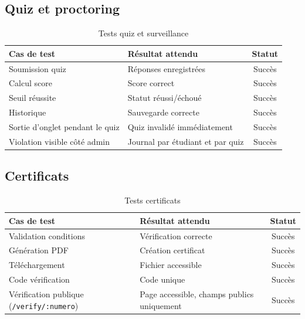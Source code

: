 \documentclass[12pt, a4paper]{report}
\begin{document}
\subsection{Quiz et proctoring}
\begin{table}[H]
\centering
\caption{Tests quiz et surveillance}
\begin{tabularx}{\textwidth}{|p{4cm}|X|c|}
\hline
\textbf{Cas de test} & \textbf{Résultat attendu} & \textbf{Statut} \\
\hline
Soumission quiz & Réponses enregistrées & Succès \\
\hline
Calcul score & Score correct & Succès \\
\hline
Seuil réussite & Statut réussi/échoué & Succès \\
\hline
Historique & Sauvegarde correcte & Succès \\
\hline
Sortie d'onglet pendant le quiz & Quiz invalidé immédiatement & Succès \\
\hline
Violation visible côté admin & Journal par étudiant et par quiz & Succès \\
\hline
\end{tabularx}
\end{table}

\subsection{Certificats}
\begin{table}[H]
\centering
\caption{Tests certificats}
\begin{tabularx}{\textwidth}{|p{4cm}|X|c|}
\hline
\textbf{Cas de test} & \textbf{Résultat attendu} & \textbf{Statut} \\
\hline
Validation conditions & Vérification correcte & Succès \\
\hline
Génération PDF & Création certificat & Succès \\
\hline
Téléchargement & Fichier accessible & Succès \\
\hline
Code vérification & Code unique & Succès \\
\hline
Vérification publique (\texttt{/verify/:numero}) & Page accessible, champs publics uniquement & Succès \\
\hline
\end{tabularx}
\end{table}
\end{document}
